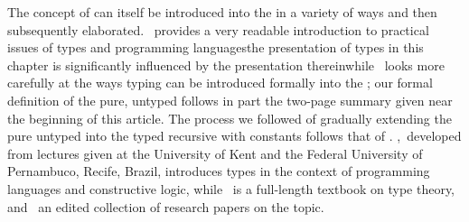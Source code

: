 The concept of  can itself be introduced into the \lambdacalc in a variety of ways and then subsequently elaborated. \citet{Cardelli:On-understanding:1985}~provides a very readable introduction to practical issues of types and programming languages\empause the presentation of types in this chapter is significantly influenced by the presentation therein\empause while \citet{Barendregt:Types:1990}~looks more carefully at the ways typing can be introduced formally into the \lambdacalc{}; our formal definition of the pure, untyped \lambdacalc follows in part the two-page summary given near the beginning of this article. The process we followed of gradually extending the pure untyped \lambdacalc into the typed recursive \lambdacalc with constants follows that of \citet{Hudak:Conception:1989}. \citet{Thompson:Type:1991},~developed from lectures given at the University of Kent and the Federal University of Pernambuco, Recife, Brazil, introduces types in the context of programming languages and constructive logic, while \citet{Pierce:Types:2002}~is a full-length textbook on type theory, and \citet{Pierce:Advanced:2005}~an edited collection of research papers on the topic.
